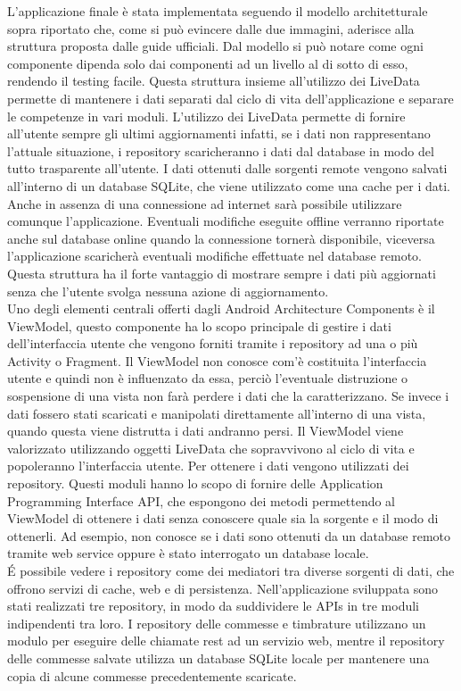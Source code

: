 \documentclass[12pt]{report}
\begin{document}
L'applicazione finale è stata implementata seguendo il modello architetturale sopra riportato che, come si può evincere dalle due immagini, aderisce alla struttura proposta dalle guide ufficiali. Dal modello si può notare come ogni componente dipenda solo dai componenti ad un livello al di sotto di esso, rendendo il testing facile. Questa struttura insieme all'utilizzo dei LiveData permette di mantenere i dati separati dal ciclo di vita dell'applicazione e separare le competenze in vari moduli. L'utilizzo dei LiveData permette di fornire all'utente sempre gli ultimi aggiornamenti infatti, se i dati non rappresentano l'attuale situazione, i repository scaricheranno i dati dal database in modo del tutto trasparente all'utente. I dati ottenuti dalle sorgenti remote vengono salvati all'interno di un database SQLite, che viene utilizzato come una cache per i dati. Anche in assenza di una connessione ad internet sarà possibile utilizzare comunque l'applicazione. Eventuali modifiche eseguite offline verranno riportate anche sul database online quando la connessione tornerà disponibile, viceversa l'applicazione scaricherà eventuali modifiche effettuate nel database remoto. Questa struttura ha il forte vantaggio di mostrare sempre i dati più aggiornati senza che l'utente svolga nessuna azione di aggiornamento.\\
Uno degli elementi centrali offerti dagli Android Architecture Components è il ViewModel, questo componente ha lo scopo principale di gestire i dati dell'interfaccia utente che vengono forniti tramite i repository ad una o più Activity o Fragment. Il ViewModel non conosce com'è costituita l'interfaccia utente e quindi non è influenzato da essa, perciò l'eventuale distruzione o sospensione di una vista non farà perdere i dati che la caratterizzano. Se invece i dati fossero stati scaricati e manipolati direttamente all'interno di una vista, quando questa viene distrutta i dati andranno persi. Il ViewModel viene valorizzato utilizzando oggetti LiveData che sopravvivono al ciclo di vita e popoleranno l'interfaccia utente. Per ottenere i dati vengono utilizzati dei repository. Questi moduli hanno lo scopo di fornire delle Application Programming Interface API, che espongono dei metodi permettendo al ViewModel di ottenere i dati senza conoscere quale sia la sorgente e il modo di ottenerli. Ad esempio, non conosce se i dati sono ottenuti da un database remoto tramite web service oppure è stato interrogato un database locale.\\
 É possibile vedere i repository come dei mediatori tra diverse sorgenti di dati, che offrono servizi di cache, web e di persistenza. Nell'applicazione sviluppata sono stati realizzati tre repository, in modo da suddividere le APIs in tre moduli indipendenti tra loro. I repository delle commesse e timbrature utilizzano un modulo per eseguire delle chiamate rest ad un servizio web, mentre il repository delle commesse salvate utilizza un database SQLite locale per mantenere una copia di alcune commesse precedentemente scaricate.
\end{document}
